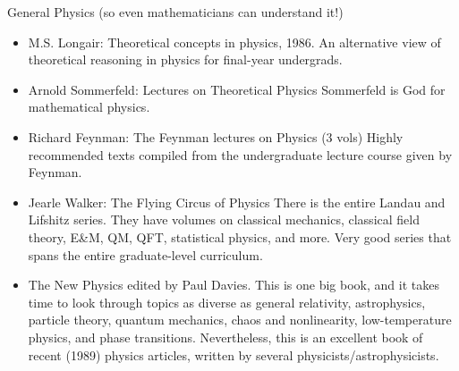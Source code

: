 \documentclass[10pt,a4paper]{book}
\theoremstyle{definition}
\begin{document}
General Physics (so even mathematicians can understand it!)

\begin{itemize}
\item M.S. Longair: Theoretical concepts in physics, 1986.
An alternative view of theoretical reasoning in physics for final-year undergrads.
\item Arnold Sommerfeld: Lectures on Theoretical Physics
Sommerfeld is God for mathematical physics.
\item Richard Feynman: The Feynman lectures on Physics (3 vols)
Highly recommended texts compiled from the undergraduate lecture course given by Feynman.

\item Jearle Walker: The Flying Circus of Physics
There is the entire Landau and Lifshitz series.  They have volumes on classical mechanics, classical field theory, E\&M, QM, QFT, statistical physics, and more.  Very good series that spans the entire graduate-level curriculum.

\item The New Physics edited by Paul Davies.
This is one big book, and it takes time to look through topics as diverse as general relativity, astrophysics, particle theory, quantum mechanics, chaos and nonlinearity, low-temperature physics, and phase transitions.  Nevertheless, this is an excellent book of recent (1989) physics articles, written by several physicists/astrophysicists.


\end{itemize}
\end{document}
